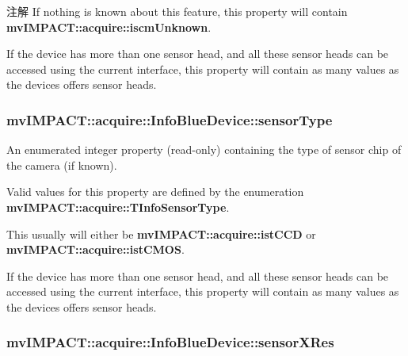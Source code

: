 \begin{DoxyNote}{注解}
If nothing is known about this feature, this property will contain {\bfseries mv\+I\+M\+P\+A\+C\+T\+::acquire\+::iscm\+Unknown}.
\end{DoxyNote}
If the device has more than one sensor head, and all these sensor heads can be accessed using the current interface, this property will contain as many values as the devices offers sensor heads. \hypertarget{classmv_i_m_p_a_c_t_1_1acquire_1_1_info_blue_device_a6936345cc2e2d0b638e50bfc6eaf7271}{
\subsubsection[{sensor\+Type}]{ mv\+I\+M\+P\+A\+C\+T\+::acquire\+::\+Info\+Blue\+Device\+::sensor\+Type}}\label{classmv_i_m_p_a_c_t_1_1acquire_1_1_info_blue_device_a6936345cc2e2d0b638e50bfc6eaf7271}


An enumerated integer property {\bfseries }(read-\/only) containing the type of sensor chip of the camera (if known). 

Valid values for this property are defined by the enumeration {\bfseries mv\+I\+M\+P\+A\+C\+T\+::acquire\+::\+T\+Info\+Sensor\+Type}.

This usually will either be {\bfseries mv\+I\+M\+P\+A\+C\+T\+::acquire\+::ist\+C\+C\+D} or {\bfseries mv\+I\+M\+P\+A\+C\+T\+::acquire\+::ist\+C\+M\+O\+S}.

If the device has more than one sensor head, and all these sensor heads can be accessed using the current interface, this property will contain as many values as the devices offers sensor heads. \hypertarget{classmv_i_m_p_a_c_t_1_1acquire_1_1_info_blue_device_a566ec34434c15f5a04cab7b8c16cda94}{
\subsubsection[{sensor\+X\+Res}]{ mv\+I\+M\+P\+A\+C\+T\+::acquire\+::\+Info\+Blue\+Device\+::sensor\+X\+Res}}\label{classmv_i_m_p_a_c_t_1_1acquire_1_1_info_blue_device_a566ec34434c15f5a04cab7b8c16cda94}


